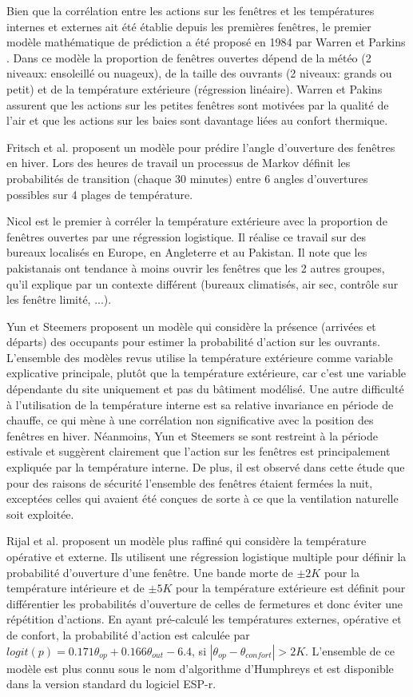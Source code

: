 Bien que la corrélation entre les actions sur les fenêtres et les températures internes et externes ait été établie depuis les premières fenêtres, le premier modèle mathématique de prédiction a été proposé en 1984 par Warren et Parkins \cite{Warren-84}. Dans ce modèle la proportion de fenêtres ouvertes dépend de la météo (2 niveaux: ensoleillé ou nuageux), de la taille des ouvrants (2 niveaux: grands ou petit) et de la température extérieure (régression linéaire). Warren et Pakins assurent que les actions sur les petites fenêtres sont motivées par la qualité de l'air et que les actions sur les baies sont davantage liées au confort thermique.

Fritsch et al. \cite{Fritsch-90} proposent un modèle pour prédire l'angle d'ouverture des fenêtres en hiver. Lors des heures de travail un processus de Markov définit les probabilités de transition (chaque 30 minutes) entre 6 angles d'ouvertures possibles sur 4 plages de température.

Nicol \cite{Nicol-01} est le premier à corréler la température extérieure avec la proportion de fenêtres ouvertes par une régression logistique. Il réalise ce travail sur des bureaux localisés en Europe, en Angleterre et au Pakistan. Il note que les pakistanais ont tendance à moins ouvrir les fenêtres que les 2 autres groupes, qu'il explique par un contexte différent (bureaux climatisés, air sec, contrôle sur les fenêtre limité, ...).

Yun et Steemers  \cite{Yun-08} proposent un modèle qui considère la présence (arrivées et départs) des occupants pour estimer la probabilité d'action sur les ouvrants. L'ensemble des modèles revus utilise la température extérieure comme variable explicative principale, plutôt que la température extérieure, car c'est une variable dépendante du site uniquement et pas du bâtiment modélisé. Une autre difficulté à l'utilisation de la température interne est sa relative invariance en période de chauffe, ce qui mène à une corrélation non significative avec la position des fenêtres en hiver. Néanmoins, Yun et Steemers se sont restreint à la période estivale et suggèrent clairement que l'action sur les fenêtres est principalement expliquée par la température interne. De plus, il est observé dans cette étude que pour des raisons de sécurité l'ensemble des fenêtres étaient fermées la nuit, exceptées celles qui avaient été conçues de sorte à ce que la ventilation naturelle soit exploitée.

Rijal et al. \cite{Rijal-08} proposent un modèle plus raffiné qui considère la température opérative et externe. Ils utilisent une régression logistique multiple pour définir la probabilité d'ouverture d'une fenêtre. Une bande morte de $\pm 2K$ pour la température intérieure et de $\pm 5K$ pour la température extérieure est définit pour différentier les probabilités d'ouverture de celles de fermetures et donc éviter une répétition d'actions. En ayant pré-calculé les températures externes, opérative et de confort, la probabilité d'action est calculée par $logit(p)=0.171\theta_{op}+0.166\theta_{out}-6.4$, si $|\theta_{op}-\theta_{confort}|>2K$. L'ensemble de ce modèle est plus connu sous le nom d'algorithme d'Humphreys et est disponible dans la version standard du logiciel ESP-r. 

